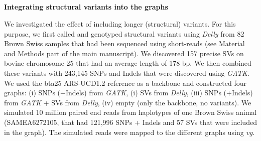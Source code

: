 \documentclass[../main.tex]{subfiles}
\begin{document}
\begin{flushleft}
\clearpage

\subsection{}
\label{sup_not:s33}
\textbf{Integrating structural variants into the graphs}
\bigskip


We investigated the effect of including longer (structural) variants. For this purpose, we first called and genotyped structural variants using \emph{Delly} \citep{rausch2012delly} from 82 Brown Swiss samples that had been sequenced using short-reads (see Material and Methods part of the main manuscript). We discovered 157 precise SVs on bovine chromosome 25 that had an average length of 178 bp. We then combined these variants with 243,145 SNPs and Indels that were discovered using \emph{GATK}. We used the bta25 ARS-UCD1.2 reference as a backbone and constructed four graphs: (i) SNPs (+Indels) from \emph{GATK}, (i) SVs from \emph{Delly},
(iii) SNPs (+Indels) from \emph{GATK} + SVs from \emph{Delly}, (iv) empty (only the backbone, no variants). We simulated 10 million paired end reads from haplotypes of one Brown Swiss animal (SAMEA6272105, that had 121,996 SNPs + Indels and 57 SVs that were included in the graph). The simulated reads were mapped to the different graphs using \emph{vg}.

\bigskip


\end{flushleft}
\end{document}
